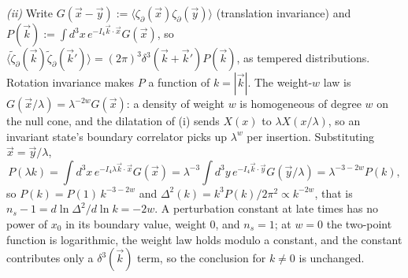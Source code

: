 \emph{(ii)} Write $G(\vec x - \vec y) := \langle\zeta_{\partial}(\vec x)\zeta_{\partial}(\vec y)\rangle$ (translation invariance) and $P(\vec k) := \int d^{3}x\, e^{-I_4\vec k\cdot\vec x}G(\vec x)$, so $\langle\tilde\zeta_{\partial}(\vec k)\tilde\zeta_{\partial}(\vec k')\rangle = (2\pi)^{3}\delta^{3}(\vec k + \vec k')P(\vec k)$, as tempered distributions. Rotation invariance makes $P$ a function of $k = |\vec k|$. The weight-$w$ law is $G(\vec x/\lambda) = \lambda^{-2w}G(\vec x)$: a density of weight $w$ is homogeneous of degree $w$ on the null cone, and the dilatation of (i) sends $X(x)$ to $\lambda X(x/\lambda)$, so an invariant state's boundary correlator picks up $\lambda^{w}$ per insertion. Substituting $\vec x = \vec y/\lambda$,
\[
P(\lambda k) = \int d^{3}x\, e^{-I_4\lambda\vec k\cdot\vec x}G(\vec x) = \lambda^{-3}\int d^{3}y\, e^{-I_4\vec k\cdot\vec y}G(\vec y/\lambda) = \lambda^{-3-2w}P(k),
\]
so $P(k) = P(1)\,k^{-3-2w}$ and $\Delta^{2}(k) = k^{3}P(k)/2\pi^{2} \propto k^{-2w}$, that is $n_{s} - 1 = d\ln\Delta^{2}/d\ln k = -2w$. A perturbation constant at late times has no power of $x_{0}$ in its boundary value, weight $0$, and $n_{s} = 1$; at $w = 0$ the two-point function is logarithmic, the weight law holds modulo a constant, and the constant contributes only a $\delta^{3}(\vec k)$ term, so the conclusion for $k \neq 0$ is unchanged.

